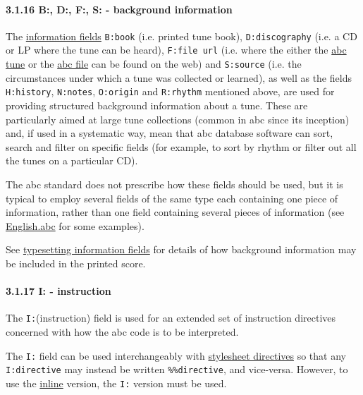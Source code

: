 \hypertarget{bdfsbackground_information}{\paragraph{3.1.16 B:, D:, F:,
S: - background information}\label{bdfsbackground_information}}

The \protect\hyperlink{information_field_definition}{information fields}
\texttt{B:book} (i.e. printed tune book), \texttt{D:discography} (i.e. a
CD or LP where the tune can be heard), \texttt{F:file\ url} (i.e. where
the either the \protect\hyperlink{abc_tune_definition}{abc tune} or the
\protect\hyperlink{abc_file_definition}{abc file} can be found on the
web) and \texttt{S:source} (i.e. the circumstances under which a tune
was collected or learned), as well as the fields \texttt{H:history},
\texttt{N:notes}, \texttt{O:origin} and \texttt{R:rhythm} mentioned
above, are used for providing structured background information about a
tune. These are particularly aimed at large tune collections (common in
abc since its inception) and, if used in a systematic way, mean that abc
database software can sort, search and filter on specific fields (for
example, to sort by rhythm or filter out all the tunes on a particular
CD).

The abc standard does not prescribe how these fields should be used, but
it is typical to employ several fields of the same type each containing
one piece of information, rather than one field containing several
pieces of information (see \protect\hyperlink{englishabc}{English.abc}
for some examples).

See \protect\hyperlink{typesetting_information_fields}{typesetting
information fields} for details of how background information may be
included in the printed score.

\hypertarget{iinstruction}{\paragraph{3.1.17 I: -
instruction}\label{iinstruction}}

The \texttt{I:}(instruction) field is used for an extended set of
instruction directives concerned with how the abc code is to be
interpreted.

The \texttt{I:} field can be used interchangeably with
\protect\hyperlink{stylesheet_directive_definition}{stylesheet
directives} so that any \texttt{I:directive} may instead be written
\texttt{\%\%directive}, and vice-versa. However, to use the
\protect\hyperlink{use_of_fields_within_the_tune_body}{inline} version,
the \texttt{I:} version must be used.

